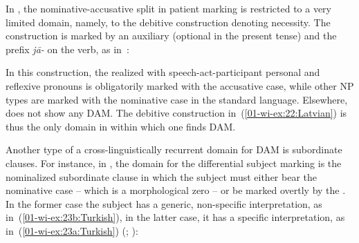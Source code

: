 \documentclass[output=paper]{LSP/langsci}
\begin{document}
In , the nominative-accusative split in patient marking is restricted to a very limited domain, namely, to the debitive construction denoting necessity. 
The construction is marked by an auxiliary (optional in the present tense) and the prefix \textit{j\=a-} on the verb, as in~:


\noindent In this construction, the  realized with speech-act-participant personal and reflexive pronouns is obligatorily marked with the accusative case, while other NP types are marked with the nominative case in the standard language. 
Elsewhere,  does not show any DAM. 
The debitive construction in~(\ref{01-wi-ex:22:Latvian}) is thus the only domain in  within which one finds DAM.

Another type of a cross-linguistically recurrent domain for DAM is subordinate clauses. 
For instance, in , the domain for the differential subject marking is the nominalized subordinate clause in which the subject must either bear the nominative case – which is a morphological zero – or be marked overtly by the . 
In the former case the subject has a generic, non-specific interpretation, as in~(\ref{01-wi-ex:23b:Turkish}), in the latter case, it has a specific  interpretation, as in~(\ref{01-wi-ex:23a:Turkish}) (\citealt[95]{Comrie1986Markedness}; \citealt[83--84]{Kornfilt2008DOM}):
\end{document}
